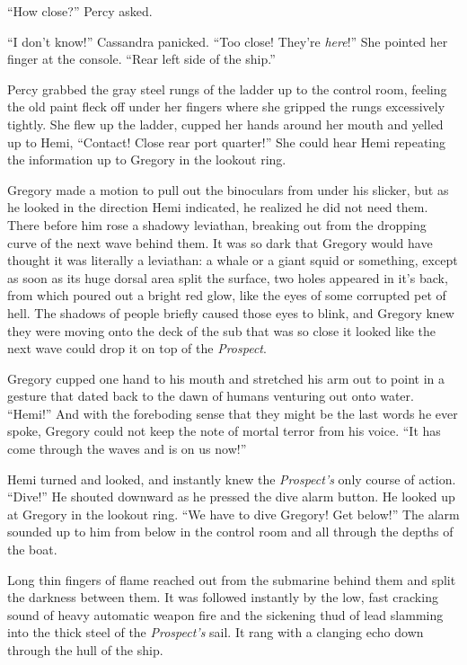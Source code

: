 \documentclass[
]{scrbook}
\begin{document}
``How close?'' Percy asked.

``I don't know!'' Cassandra panicked. ``Too close! They're
\emph{here}!'' She pointed her finger at the console. ``Rear left side
of the ship.''

Percy grabbed the gray steel rungs of the ladder up to the control room,
feeling the old paint fleck off under her fingers where she gripped the
rungs excessively tightly. She flew up the ladder, cupped her hands
around her mouth and yelled up to Hemi, ``Contact! Close rear port
quarter!'' She could hear Hemi repeating the information up to Gregory
in the lookout ring.

Gregory made a motion to pull out the binoculars from under his slicker,
but as he looked in the direction Hemi indicated, he realized he did not
need them. There before him rose a shadowy leviathan, breaking out from
the dropping curve of the next wave behind them. It was so dark that
Gregory would have thought it was literally a leviathan: a whale or a
giant squid or something, except as soon as its huge dorsal area split
the surface, two holes appeared in it's back, from which poured out a
bright red glow, like the eyes of some corrupted pet of hell. The
shadows of people briefly caused those eyes to blink, and Gregory knew
they were moving onto the deck of the sub that was so close it looked
like the next wave could drop it on top of the \emph{Prospect}.

Gregory cupped one hand to his mouth and stretched his arm out to point
in a gesture that dated back to the dawn of humans venturing out onto
water. ``Hemi!'' And with the foreboding sense that they might be the
last words he ever spoke, Gregory could not keep the note of mortal
terror from his voice. ``It has come through the waves and is on us
now!''

Hemi turned and looked, and instantly knew the \emph{Prospect's} only
course of action. ``Dive!'' He shouted downward as he pressed the dive
alarm button. He looked up at Gregory in the lookout ring. ``We have to
dive Gregory! Get below!'' The alarm sounded up to him from below in the
control room and all through the depths of the boat.

Long thin fingers of flame reached out from the submarine behind them
and split the darkness between them. It was followed instantly by the
low, fast cracking sound of heavy automatic weapon fire and the
sickening thud of lead slamming into the thick steel of the
\emph{Prospect's} sail. It rang with a clanging echo down through the
hull of the ship.
\end{document}
